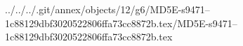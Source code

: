 ../../../.git/annex/objects/12/g6/MD5E-s9471--1c88129dbf3020522806ffa73cc8872b.tex/MD5E-s9471--1c88129dbf3020522806ffa73cc8872b.tex